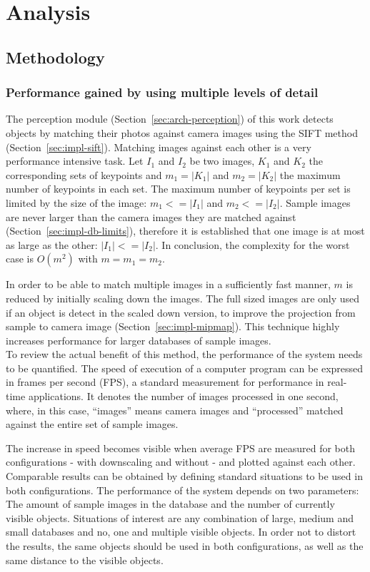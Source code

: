 \chapter{Analysis}
\label{chap:analysis}

\section{Methodology}

\subsection{Performance gained by using multiple levels of detail}
\label{sec:analysis-mipmap}
The perception module (Section~\ref{sec:arch-perception}) of this work detects objects by matching their photos against camera images using the SIFT method (Section~\ref{sec:impl-sift}). Matching images against each other is a very performance intensive task. Let $I_1$ and $I_2$ be two images, $K_1$ and $K_2$ the corresponding sets of keypoints and $m_1 = |K_1|$ and $m_2 = |K_2|$ the maximum number of keypoints in each set. The maximum number of keypoints per set is limited by the size of the image: $m_1 <= |I_1|$ and $m_2 <= |I_2|$. Sample images are never larger than the camera images they are matched against (Section~\ref{sec:impl-db-limits}), therefore it is established that one image is at most as large as the other: $|I_1| <= |I_2|$. In conclusion, the complexity for the worst case is $O(m^2)$ with $m = m_1 = m_2$.

In order to be able to match multiple images in a sufficiently fast manner, $m$ is reduced by initially scaling down the images. The full sized images are only used if an object is detect in the scaled down version, to improve the projection from sample to camera image (Section~\ref{sec:impl-mipmap}). This technique highly increases performance for larger databases of sample images. \\

To review the actual benefit of this method, the performance of the system needs to be quantified. The speed of execution of a computer program can be expressed in frames per second (FPS), a standard measurement for performance in real-time applications. It denotes the number of images processed in one second, where, in this case, ``images'' means camera images and ``processed'' matched against the entire set of sample images.

The increase in speed becomes visible when average FPS are measured for both configurations - with downscaling and without - and plotted against each other. Comparable results can be obtained by defining standard situations to be used in both configurations. The performance of the system depends on two parameters: The amount of sample images in the database and the number of currently visible objects. Situations of interest are any combination of large, medium and small databases and no, one and multiple visible objects. In order not to distort the results, the same objects should be used in both configurations, as well as the same distance to the visible objects. \\

